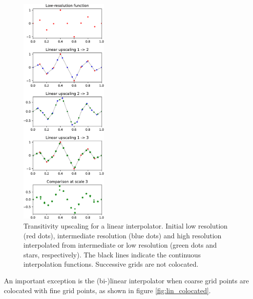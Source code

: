 \documentclass[12pt]{scrartcl}
\begin{document}
\begin{figure}[!h]
\begin{center}
\includegraphics[width=0.39\textwidth]{interpolation_comparison_lin.pdf}
\end{center}
\caption{\label{fig:lin} Transitivity upscaling for a linear interpolator. Initial low resolution (red dots), intermediate resolution (blue dots) and high resolution interpolated from intermediate or low resolution (green dots and stars, respectively). The black lines indicate the continuous interpolation functions. Successive grids are not colocated.}
\end{figure}

\clearpage

An important exception is the (bi-)linear interpolator when coarse grid points are colocated with fine grid points, as shown in figure \ref{fig:lin_colocated}.
\end{document}
